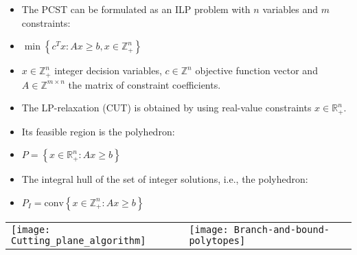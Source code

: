 \documentclass[11pt, a4paper, landscape]{article}
\begin{document}
\NewPage{}
\vfill
\begin{itemize}
\item The PCST can be formulated as an ILP problem with $n$ variables and $m$ constraints:
\item[]
\begin{center}
$\min \left\lbrace c^Tx : Ax \geq b, x \in \mathbb{Z}_+^n \right\rbrace $
\end{center}
\item $x \in \mathbb{Z}_+^n$ integer decision variables, $c \in \mathbb{Z}^n$ objective function vector and $A \in \mathbb{Z}^{m \times n}$ the matrix of constraint coefficients.
\item The LP-relaxation (CUT) is obtained by using real-value constraints $x \in \mathbb{R}_+^n$.
\item Its feasible region is the polyhedron:
\item[]
\begin{center}
$P = \left\lbrace x \in \mathbb{R}_+^n : Ax \geq b \right\rbrace $
\end{center}
\item The integral hull of the set of integer solutions, i.e., the polyhedron:
\item[]
\begin{center}
$P_I = \mbox{conv} \left\lbrace x \in \mathbb{Z}_+^n : Ax \geq b \right\rbrace $
\end{center}
\end{itemize}
\begin{table}
  \centering
  \begin{tabular}{@{} M{.5\linewidth} M{.5\linewidth} @{}}
  	\texttt{[image: Cutting\_plane\_algorithm]}
      &
    \texttt{[image: Branch-and-bound-polytopes]}
  \end{tabular}
\end{table}
\vfill
\end{document}

